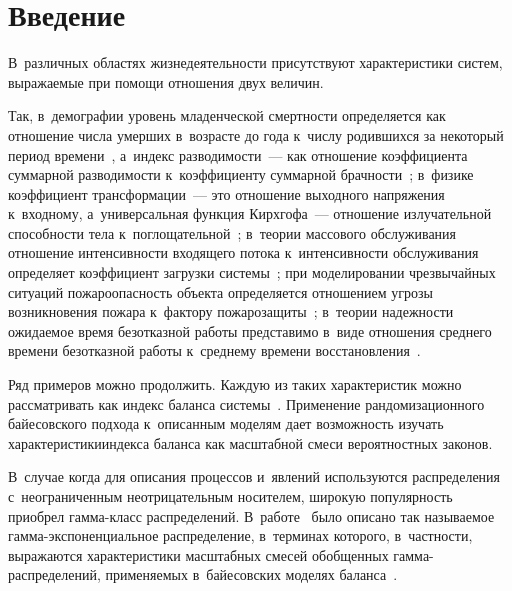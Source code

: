 
 
\vspace*{-6pt}



\thispagestyle{headings}

\begin{multicols}{2}

\label{st\stat}

\section{Введение}

В~различных областях жизнедеятельности присутствуют характеристики систем, 
выражаемые при помощи отношения двух  величин. 

Так, в~демографии уровень 
младенческой смертности определяется как отношение чис\-ла умерших в~возрасте до 
года к~числу родившихся за некоторый период времени~\cite{Borisov2001}, а~индекс 
раз\-во\-ди\-мости~--- как отношение коэффициента суммарной разводимости к~коэффициенту 
суммарной брач\-ности~\cite{Rybako2005}; в~физике коэффициент трансформации~--- 
это  отношение выходного напряжения к~входному, 
а~универсальная функция Кирхгофа~--- 
отношение излучательной способности тела к~поглощательной~\cite{KuzRog2012}; 
в~тео\-рии массового обслуживания отношение интенсивности входящего потока 
к~ин\-тен\-сив\-ности обслуживания определяет коэффициент загрузки 
сис\-те\-мы~\cite{BoPe1995}; при моделировании чрезвычайных ситуаций пожароопасность объекта 
определяется отношением угрозы возникновения пожара к~фактору пожарозащиты~\cite{ShaRaSha2010}; 
в~тео\-рии на\-деж\-ности ожи\-да\-емое время безотказной работы 
представимо в~виде отношения среднего времени безотказной работы к~среднему 
времени восстановления~\cite{ZdRo2004}. 

Ряд примеров можно продолжить. Каждую из 
таких характеристик можно рассматривать как индекс баланса системы~\cite{Ku2018}.
Применение рандомизационного байесовского подхода к~описанным моделям дает 
возможность изучать характеристики\linebreak индекса баланса как масштабной смеси 
вероятностных законов. 

В~случае когда для описания процессов и~явлений 
используются распределения с~неограниченным неотрицательным носителем, широкую 
популярность приобрел гам\-ма-класс распределений. В~работе~\cite{Ku2019_2} было 
описано так называемое гам\-ма-экс\-по\-нен\-ци\-аль\-ное распределение, в~терминах 
которого, в~част\-ности, выражаются характеристики масштабных смесей обобщенных 
гамма-рас\-пре\-де\-ле\-ний, применяемых в~байесовских моделях баланса~\cite{Ku2018}.


\end{multicols}
